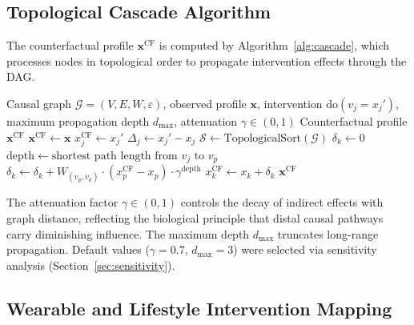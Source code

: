 \documentclass[runningheads]{llncs}
\begin{document}
\subsection{Topological Cascade Algorithm}\label{sec:cascade}

The counterfactual profile $\mathbf{x}^{\mathrm{CF}}$ is computed by
Algorithm~\ref{alg:cascade}, which processes nodes in topological
order to propagate intervention effects through the DAG.

\begin{algorithm}[t]
\caption{Topological Counterfactual Cascade}
\label{alg:cascade}
\begin{algorithmic}[1]
\REQUIRE Causal graph $\mathcal{G}=(V,E,W,\varepsilon)$, observed
  profile $\mathbf{x}$, intervention $\mathrm{do}(v_j = x_j')$,
  maximum propagation depth $d_{\max}$, attenuation $\gamma \in (0,1)$
\ENSURE Counterfactual profile $\mathbf{x}^{\mathrm{CF}}$
\STATE $\mathbf{x}^{\mathrm{CF}} \leftarrow \mathbf{x}$ 
\STATE $x_j^{\mathrm{CF}} \leftarrow x_j'$ 
\STATE $\Delta_j \leftarrow x_j' - x_j$
\STATE $\mathcal{S} \leftarrow \text{TopologicalSort}(\mathcal{G})$
  \STATE $\delta_k \leftarrow 0$
    \STATE $\mathrm{depth} \leftarrow \text{shortest path length from } v_j \text{ to } v_p$
      \STATE $\delta_k \leftarrow \delta_k + W_{(v_p,v_k)} \cdot (x_p^{\mathrm{CF}} - x_p) \cdot \gamma^{\mathrm{depth}}$
    \ENDIF
  \ENDFOR
  \STATE $x_k^{\mathrm{CF}} \leftarrow x_k + \delta_k$
\ENDFOR
\RETURN $\mathbf{x}^{\mathrm{CF}}$
\end{algorithmic}
\end{algorithm}

The attenuation factor $\gamma \in (0,1)$ controls the decay of
indirect effects with graph distance, reflecting the biological
principle that distal causal pathways carry diminishing influence.
The maximum depth $d_{\max}$ truncates long-range propagation.
Default values ($\gamma = 0.7$, $d_{\max} = 3$) were selected via
sensitivity analysis (Section~\ref{sec:sensitivity}).

\subsection{Wearable and Lifestyle Intervention Mapping}
\label{sec:wearable}
\end{document}
